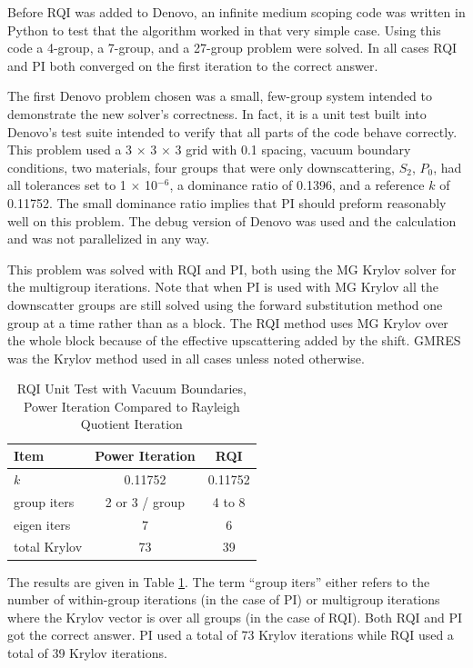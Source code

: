 Before RQI was added to Denovo, an infinite medium scoping code was written in Python to test that the algorithm worked in that very simple case.  Using this code a 4-group, a 7-group, and a 27-group problem were solved. In all cases RQI and PI both converged on the first iteration to the correct answer. 

The first Denovo problem chosen was a small, few-group system intended to demonstrate the new solver's correctness. In fact, it is a unit test built into Denovo's test suite intended to verify that all parts of the code behave correctly. This problem used a 3 $\times$ 3 $\times$ 3 grid with 0.1 spacing, vacuum boundary conditions, two materials, four groups that were only downscattering, $S_{2}$, $P_{0}$, had all tolerances set to 1 $\times$ 10$^{-6}$, a dominance ratio of 0.1396, and a reference $k$ of 0.11752. The small dominance ratio implies that PI should preform reasonably well on this problem. The debug version of Denovo was used and the calculation and was not parallelized in any way. 

This problem was solved with RQI and PI, both using the MG Krylov solver for the multigroup iterations. Note that when PI is used with MG Krylov all the downscatter groups are still solved using the forward substitution method one group at a time rather than as a block. The RQI method uses MG Krylov over the whole block because of the effective upscattering added by the shift. GMRES was the Krylov method used in all cases unless noted otherwise.

\begin{table}[!h]
\caption{RQI Unit Test with Vacuum Boundaries, Power Iteration Compared to Rayleigh Quotient Iteration}
\begin{center}
\begin{tabular}{| l | c | c |}
\hline
Item & Power Iteration & RQI \\[0.5ex]
\hline
$k$ & 0.11752 & 0.11752 \\
group iters & 2 or 3 / group   & 4 to 8 \\
eigen iters & 7 & 6 \\
total Krylov & 73 & 39 \\
\hline
\end{tabular}
\end{center}
\label{table:SmallVacuumRQI}
\end{table}
%
The results are given in Table \ref{table:SmallVacuumRQI}. The term ``group iters'' either refers to the number of within-group iterations (in the case of PI) or multigroup iterations where the Krylov vector is over all groups (in the case of RQI). Both RQI and PI got the correct answer. PI used a total of 73 Krylov iterations while RQI used a total of 39 Krylov iterations. 

